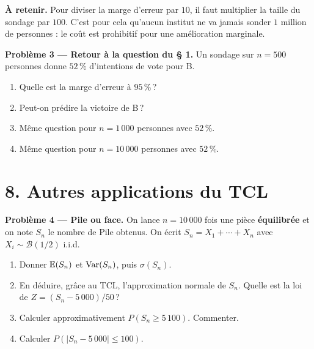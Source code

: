 \textbf{À retenir.} Pour diviser la marge d'erreur par $10$, il
faut multiplier la taille du sondage par $100$. C'est pour cela
qu'aucun institut ne va jamais sonder $1$ million de personnes :
le coût est prohibitif pour une amélioration marginale.

\medskip

\textbf{Problème 3 --- Retour à la question du § 1.}
Un sondage sur $n=500$ personnes donne $52\,\%$ d'intentions de
vote pour B.
\begin{enumerate}
  \item Quelle est la marge d'erreur à $95\,\%$\,?
  \item Peut-on \og prédire \fg{} la victoire de B\,?
  \item Même question pour $n=1\,000$ personnes avec $52\,\%$.
  \item Même question pour $n=10\,000$ personnes avec $52\,\%$.
\end{enumerate}


\section*{8. Autres applications du TCL}

\textbf{Problème 4 --- Pile ou face.}
On lance $n=10\,000$ fois une pièce \textbf{équilibrée} et on note
$S_n$ le nombre de Pile obtenus. On écrit $S_n=X_1+\cdots+X_n$
avec $X_i\sim\mathcal{B}(1/2)$ i.i.d.
\begin{enumerate}
  \item Donner $\mathbb{E}(S_n)$ et $\operatorname{Var}(S_n)$, puis $\sigma(S_n)$.
  \item En déduire, grâce au TCL, l'approximation normale
    de $S_n$. Quelle est la loi de $Z=(S_n-5\,000)/50$\,?
  \item Calculer approximativement $P(S_n\ge 5\,100)$.
    Commenter.
  \item Calculer $P(|S_n-5\,000|\le 100)$.
\end{enumerate}

